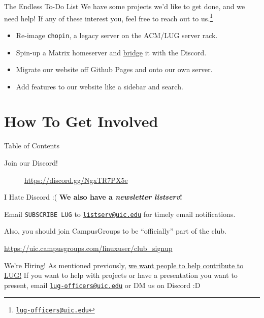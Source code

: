 \documentclass{beamer}
\begin{document}
\begin{frame}{The Endless To-Do List}
	We have some projects we'd like to get done, and we need help! If any
	of these interest you, feel free to reach out to us.\footnote{
		\href{mailto:lug-officers@uic.edu}{\texttt{lug-officers@uic.edu}}}
	\pause

	\begin{itemize}
		\item Re-image \texttt{chopin}, a legacy server on the ACM/LUG
		      server rack.
		\item Spin-up a Matrix homeserver and \underline{bridge} it
		      with the Discord.
		\item Migrate our website off Github Pages and onto our own
		      server.
		\item Add features to our website like a sidebar and search.
	\end{itemize}
\end{frame}

\section{How To Get Involved}
\begin{frame}{Table of Contents}
	\tableofcontents[currentsection]
\end{frame}

\begin{frame}{Join our Discord!}
	\begin{figure}
		\centering
		
		\caption{\url{https://discord.gg/NgxTR7PX5e}}
	\end{figure}
\end{frame}

\begin{frame}{I Hate Discord \>:(}
	\textbf{We also have a \textit{newsletter listserv}!}

	Email \texttt{SUBSCRIBE LUG} to
	\href{mailto:listserv@uic.edu}{\texttt{listserv@uic.edu}} for timely
	email notifications.

	Also, you should join CampusGroups to be ``officially'' part of the club.

	\url{https://uic.campusgroups.com/linuxuser/club\_signup}
\end{frame}

\begin{frame}{We're Hiring!}
	As mentioned previously, \underline{we want people to help contribute
		to LUG!} \pause If you want to help with projects or have a
	presentation you want to present, email
	\href{mailto:lug-officers@uic.edu}{\texttt{lug-officers@uic.edu}} or DM
	us on Discord :D
\end{frame}
\end{document}
